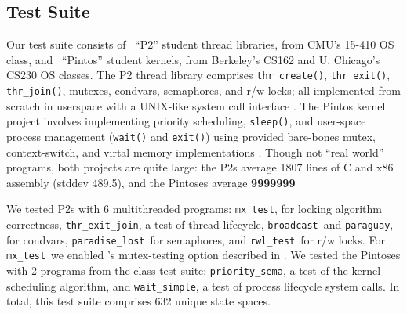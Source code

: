 \subsection{Test Suite}
Our test suite consists of \numthrlibs~``P2'' student thread libraries, from CMU's 15-410 OS class,
and \numpintoses~``Pintos'' student kernels, from Berkeley's CS162 and U. Chicago's CS230 OS classes.
%
The P2 thread library comprises \texttt{thr\_create()}, \texttt{thr\_exit()}, \texttt{thr\_join()}, mutexes, condvars, semaphores, and r/w locks;
all implemented from scratch in userspace with a UNIX-like system call interface \cite{kspec,thrlib}.
%
The Pintos kernel project
involves implementing priority scheduling, \texttt{sleep()}, and user-space process management (\texttt{wait()} and \texttt{exit()})
using provided bare-bones mutex, context-switch, and virtal memory implementations
\cite{pintos}.
Though not ``real world'' programs, both projects are quite large: %
the P2s average 1807 lines of C and x86 assembly (stddev 489.5),
and the Pintoses average {\bf 9999999} %

\newcommand\mxtest{\texttt{mx\_test}}
\newcommand\tej{\texttt{thr\_exit\_join}}
\newcommand\bct{\texttt{broadcast}}
\newcommand\paraguay{\texttt{paraguay}}
\newcommand\paradise{\texttt{paradise\_lost}}
\newcommand\rwl{\texttt{rwl\_test}}
We tested P2s with 6 multithreaded programs:
\mxtest, for locking algorithm correctness, \tej, a test of thread lifecycle, \bct~and \paraguay, for condvars, \paradise~for semaphores, and \rwl~for r/w locks.
For \mxtest~we enabled \landslide's mutex-testing option described in \sect{\ref{sec:landslide}}.
\newcommand\prisema{\texttt{priority\_sema}}
\newcommand\waitsimple{\texttt{wait\_simple}}
We tested the Pintoses with 2 programs from the class test suite: \prisema, a test of the kernel scheduling algorithm, and \waitsimple, a test of process lifecycle system calls.
In total, this test suite comprises 632 unique state spaces.

